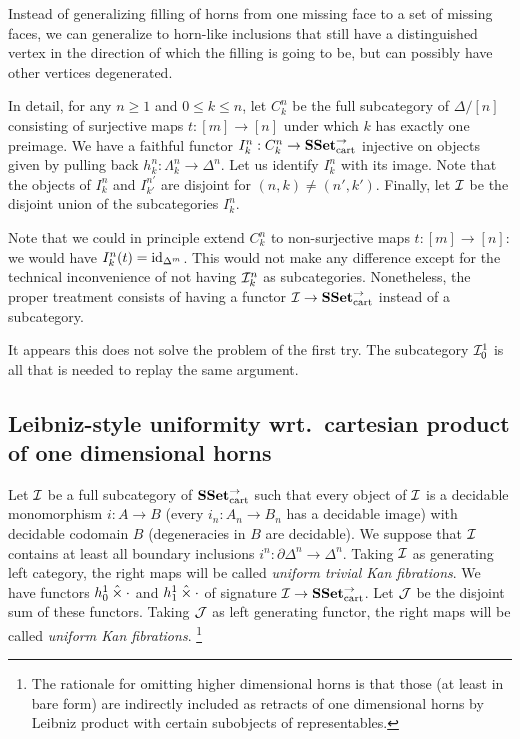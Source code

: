 \documentclass[reqno,10pt,a4paper,oneside]{amsart}
\begin{document}
Instead of generalizing filling of horns from one missing face to a set of missing faces, we can generalize to horn-like inclusions that still have a distinguished vertex in the direction of which the filling is going to be, but can possibly have other vertices degenerated.

In detail, for any $n \geq 1$ and $0 \leq k \leq n$, let $C_k^n$ be the full subcategory of $\Delta/[n]$ consisting of surjective maps $t : [m] \to [n]$ under which $k$ has exactly one preimage.
We have a faithful functor $I_k^n : C_k^n \to \SSet_{\text{cart}}^{\to}$ injective on objects given by pulling back $h_k^n : \Lambda_k^n \to \Delta^n$.
Let us identify $I_k^n$ with its image.
Note that the objects of $I_k^n$ and $I_{k'}^{n'}$ are disjoint for $(n, k) \neq (n', k')$.
Finally, let $\cal{I}$ be the disjoint union of the subcategories $I_k^n$.

Note that we could in principle extend $C_k^n$ to non-surjective maps $t : [m] \to [n]$: we would have $I_k^n(t) = \id_{\Delta^m}$.
This would not make any difference except for the technical inconvenience of not having $\cal{I}_k^n$ as subcategories.
Nonetheless, the proper treatment consists of having a functor $\cal{I} \to \SSet_{\text{cart}}^{\to}$ instead of a subcategory.

It appears this does not solve the problem of the first try.
The subcategory $\cal{I}_0^1$ is all that is needed to replay the same argument.

\subsection*{Leibniz-style uniformity wrt.\ cartesian product of one dimensional horns}

Let $\cal{I}$ be a full subcategory of $\SSet_{\text{cart}}^{\to}$ such that every object of $\cal{I}$ is a decidable monomorphism $i : A \to B$ (\ie every $i_n : A_n \to B_n$ has a decidable image) with decidable codomain $B$ (\ie degeneracies in $B$ are decidable).
We suppose that $\cal{I}$ contains at least all boundary inclusions $i^n : \partial \Delta^n \to \Delta^n$.
Taking $\cal{I}$ as generating left category, the right maps will be called \emph{uniform trivial Kan fibrations}.
We have functors $h_0^1 \hattimes \arghole$ and $h_1^1 \hattimes \arghole$ of signature $\cal{I} \to \SSet_{\text{cart}}^{\to}$.
Let $\cal{J}$ be the disjoint sum of these functors.
Taking $\cal{J}$ as left generating functor, the right maps will be called \emph{uniform Kan fibrations}.
\footnote{The rationale for omitting higher dimensional horns is that those (at least in bare form) are indirectly included as retracts of one dimensional horns by Leibniz product with certain subobjects of representables.}
\end{document}

